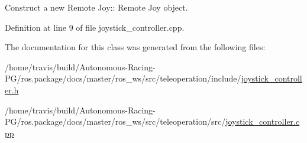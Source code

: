 Construct a new Remote Joy\+:\+: Remote Joy object. 



Definition at line 9 of file joystick\+\_\+controller.\+cpp.



The documentation for this class was generated from the following files\+:\begin{DoxyCompactItemize}
\item 
/home/travis/build/\+Autonomous-\/\+Racing-\/\+P\+G/ros.\+package/docs/master/ros\+\_\+ws/src/teleoperation/include/\hyperlink{joystick__controller_8h}{joystick\+\_\+controller.\+h}\item 
/home/travis/build/\+Autonomous-\/\+Racing-\/\+P\+G/ros.\+package/docs/master/ros\+\_\+ws/src/teleoperation/src/\hyperlink{joystick__controller_8cpp}{joystick\+\_\+controller.\+cpp}\end{DoxyCompactItemize}
